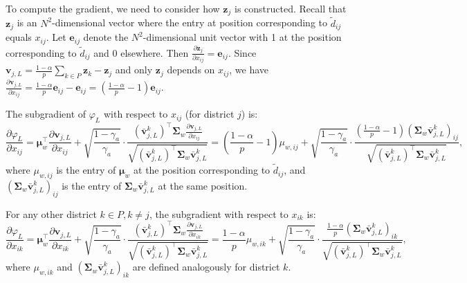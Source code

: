 \documentclass[preprint,12pt,authoryear]{elsarticle}
\begin{document}
To compute the gradient, we need to consider how $\mathbf{z}_j$ is constructed. Recall that $\mathbf{z}_j$ is an $N^2$-dimensional vector where the entry at position corresponding to $\tilde{d}_{ij}$ equals $x_{ij}$. Let $\mathbf{e}_{ij}$ denote the $N^2$-dimensional unit vector with 1 at the position corresponding to $\tilde{d}_{ij}$ and 0 elsewhere. Then $\frac{\partial \mathbf{z}_j}{\partial x_{ij}} = \mathbf{e}_{ij}$. Since $\mathbf{v}_{j,L} = \frac{1-\alpha}{p}\sum_{k \in P} \mathbf{z}_k - \mathbf{z}_j$ and only $\mathbf{z}_j$ depends on $x_{ij}$, we have $\frac{\partial \mathbf{v}_{j,L}}{\partial x_{ij}} = \frac{1-\alpha}{p}\mathbf{e}_{ij} - \mathbf{e}_{ij} = \left(\frac{1-\alpha}{p} - 1\right)\mathbf{e}_{ij}$.

The subgradient of $\varphi_L$ with respect to $x_{ij}$ (for district $j$) is:
\begin{equation}
\frac{\partial \varphi_L}{\partial x_{ij}} = \boldsymbol{\mu}_w^\top \frac{\partial \mathbf{v}_{j,L}}{\partial x_{ij}} + \sqrt{\frac{1-\gamma_a}{\gamma_a}} \cdot \frac{(\bar{\mathbf{v}}_{j,L}^k)^\top \boldsymbol{\Sigma}_w \frac{\partial \mathbf{v}_{j,L}}{\partial x_{ij}}}{\sqrt{(\bar{\mathbf{v}}_{j,L}^k)^\top \boldsymbol{\Sigma}_w \bar{\mathbf{v}}_{j,L}^k}} = \left(\frac{1-\alpha}{p} - 1\right) \mu_{w,ij} + \sqrt{\frac{1-\gamma_a}{\gamma_a}} \cdot \frac{\left(\frac{1-\alpha}{p} - 1\right) (\boldsymbol{\Sigma}_w \bar{\mathbf{v}}_{j,L}^k)_{ij}}{\sqrt{(\bar{\mathbf{v}}_{j,L}^k)^\top \boldsymbol{\Sigma}_w \bar{\mathbf{v}}_{j,L}^k}},
\label{eq:assign_dep_rel_d1_subgradient_L_ij}
\end{equation}
where $\mu_{w,ij}$ is the entry of $\boldsymbol{\mu}_w$ at the position corresponding to $\tilde{d}_{ij}$, and $(\boldsymbol{\Sigma}_w \bar{\mathbf{v}}_{j,L}^k)_{ij}$ is the entry of $\boldsymbol{\Sigma}_w \bar{\mathbf{v}}_{j,L}^k$ at the same position.

For any other district $k \in P, k \neq j$, the subgradient with respect to $x_{ik}$ is:
\begin{equation}
\frac{\partial \varphi_L}{\partial x_{ik}} = \boldsymbol{\mu}_w^\top \frac{\partial \mathbf{v}_{j,L}}{\partial x_{ik}} + \sqrt{\frac{1-\gamma_a}{\gamma_a}} \cdot \frac{(\bar{\mathbf{v}}_{j,L}^k)^\top \boldsymbol{\Sigma}_w \frac{\partial \mathbf{v}_{j,L}}{\partial x_{ik}}}{\sqrt{(\bar{\mathbf{v}}_{j,L}^k)^\top \boldsymbol{\Sigma}_w \bar{\mathbf{v}}_{j,L}^k}} = \frac{1-\alpha}{p} \mu_{w,ik} + \sqrt{\frac{1-\gamma_a}{\gamma_a}} \cdot \frac{\frac{1-\alpha}{p} (\boldsymbol{\Sigma}_w \bar{\mathbf{v}}_{j,L}^k)_{ik}}{\sqrt{(\bar{\mathbf{v}}_{j,L}^k)^\top \boldsymbol{\Sigma}_w \bar{\mathbf{v}}_{j,L}^k}},
\label{eq:assign_dep_rel_d1_subgradient_L_ik}
\end{equation}
where $\mu_{w,ik}$ and $(\boldsymbol{\Sigma}_w \bar{\mathbf{v}}_{j,L}^k)_{ik}$ are defined analogously for district $k$.
\end{document}
